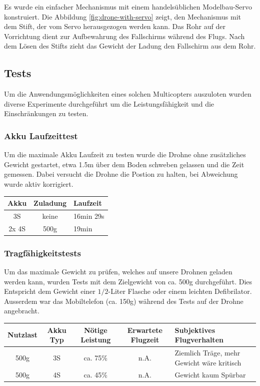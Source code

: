Es wurde ein einfacher Mechanismus mit einem handelsüblichen Modelbau-Servo konstruiert. Die Abbildung \ref{fig:drone-with-servo} zeigt, den Mechanismus mit dem Stift, der vom Servo herausgezogen werden kann. Das Rohr auf der Vorrichtung dient zur Aufbewahrung des Fallschirms während des Flugs. Nach dem Lösen des Stifts zieht das Gewicht der Ladung den Fallschirm aus dem Rohr.\\

\subsection{Tests}
Um die Anwendungsmöglichkeiten eines solchen Multicopters auszuloten wurden diverse Experimente durchgeführt um die Leistungsfähigkeit und die Einschränkungen zu testen. 

\subsubsection{Akku Laufzeittest}
Um die maximale Akku Laufzeit zu testen wurde die Drohne ohne zusätzliches Gewicht gestartet, etwa 1.5m über dem Boden schweben gelassen und die Zeit gemessen. Dabei versucht die Drohne die Postion zu halten, bei Abweichung wurde aktiv korrigiert. \\

\begin{tabularx}{\textwidth}{|c|c|X|}
	\hline
	\textbf{Akku} & \textbf{Zuladung} & \textbf{Laufzeit} \\ \hline \hline 
	3S & keine & 16min 29s\\ \hline 
	2x 4S & 500g & 19min\\ \hline 
\end{tabularx}

\subsubsection{Tragfähigkeitstests}
Um das maximale Gewicht zu prüfen, welches auf unsere Drohnen geladen werden kann, wurden Tests mit dem Zielgewicht von ca. 500g durchgeführt. Dies Entspricht dem Gewicht einer $1/2$-Liter Flasche oder einem leichten Defibrilator. Ausserdem war das Mobiltelefon (ca. 150g) während des Tests auf der Drohne angebracht.  \\

\begin{tabularx}{\textwidth}{|c|c|c|c|X|}
	\hline
	\textbf{Nutzlast} & \textbf{Akku Typ} & \textbf{Nötige Leistung }& \textbf{Erwartete Flugzeit } & \textbf{Subjektives Flugverhalten }\\
	\hline \hline
	500g & 3S & ca. 75\%  & n.A. & Ziemlich Träge, mehr Gewicht wäre kritisch\\\hline
	500g & 4S & ca. 45\%  & n.A. & Gewicht kaum Spürbar\\
	\hline
\end{tabularx}\\

